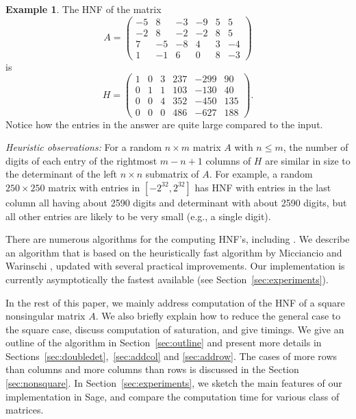 \documentclass[preprint,12pt]{elsarticle}
\theoremstyle{plain}
\theoremstyle{definition}
\newtheorem{example}[theorem]{Example}
\numberwithin{equation}{section}
\numberwithin{figure}{section}
\numberwithin{table}{section}
\begin{document}
\begin{example}
The HNF of the matrix
$$
A = \left(\begin{array}{rrrrrr}
-5 & 8 & -3 & -9 & 5 & 5 \\
-2 & 8 & -2 & -2 & 8 & 5 \\
7 & -5 & -8 & 4 & 3 & -4 \\
1 & -1 & 6 & 0 & 8 & -3
\end{array}\right)
$$
is
$$
H = \left(\begin{array}{rrrrrr}
1 & 0 & 3 & 237 & -299 & 90 \\
0 & 1 & 1 & 103 & -130 & 40 \\
0 & 0 & 4 & 352 & -450 & 135 \\
0 & 0 & 0 & 486 & -627 & 188
\end{array}\right).$$
Notice how the entries in the answer are quite large compared to the
input.  

{\em Heuristic observations:} For a random $n\times m$ matrix $A$ with
$n\leq m$, the number of digits of each entry of the rightmost $m-n+1$
columns of $H$ are similar in size to the determinant of the left
$n\times n$ submatrix of $A$.  For example, a random $250\times 250$
matrix with entries in $[-2^{32},2^{32}]$ has HNF with entries in the
last column all having about 2590 digits and determinant with about
2590 digits, but all other entries are likely to be very small (e.g.,
a single digit).
\end{example}


There are numerous algorithms for the computing HNF's, including
\cite{KanBach79,DomKan87,Brad89,MicWar01}.  We describe an algorithm
that is based on the heuristically fast algorithm by Micciancio and
Warinschi \cite{MicWar01}, updated with  several practical improvements.
Our implementation is currently asymptotically the fastest available
(see Section~\ref{sec:experiments}).


In the rest of this paper, we mainly address computation of the HNF of
a square nonsingular matrix $A$.  We also briefly explain how to
reduce the general case to the square case, discuss computation of 
saturation, and give timings.  We give an outline of the algorithm in
Section~\ref{sec:outline} and present more details in
Sections~\ref{sec:doubledet},~\ref{sec:addcol} and \ref{sec:addrow}.
The cases of more rows than columns and more columns than rows is 
discussed in the Section \ref{sec:nonsquare}.  In
Section~\ref{sec:experiments}, we sketch the main features of our
implementation in Sage, and compare the computation time for various
class of matrices.
\end{document}
